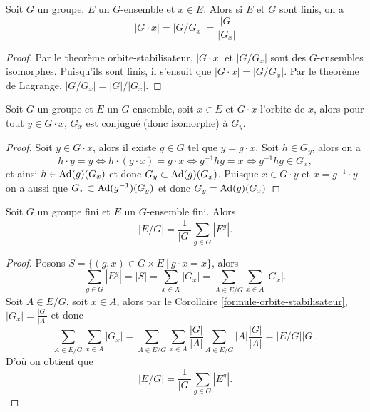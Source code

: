 \begin{cor}
	\label{formule-orbite-stabilisateur}
	Soit $G$ un groupe, $E$ un $G$-ensemble et $x \in E$. Alors si $E$ et $G$ sont finis, on a
	\begin{equation*}
		|G \cdot x| = |G/G_x| = \frac{|G|}{|G_x|}
	\end{equation*}
\end{cor}

\begin{proof}
	Par le theorème orbite-stabilisateur, $|G \cdot x|$ et $|G/G_x|$
	sont des $G$-ensembles isomorphes. Puisqu'ils sont finis,
	il s'ensuit que $|G \cdot x| = |G/G_x|$.
	Par le theorème de Lagrange, $|G/G_x| = |G|/|G_x|$.
\end{proof}

\begin{prop}
	\label{stab-conjugue}
	Soit $G$ un groupe et $E$ un $G$-ensemble, soit $x \in E$ et
	$G \cdot x$ l'orbite de $x$, alors pour tout $y \in G \cdot x$,
	$G_x$ est conjugué (donc isomorphe) à $G_y$.
\end{prop}

\begin{proof}
	Soit $y \in G \cdot x$, alors il existe $g \in G$ tel que $y = g \cdot x$.
	Soit $h \in G_y$, alors on a
	\begin{equation*}
		h \cdot y = y \iff h \cdot (g \cdot x) = g \cdot x \iff
		g^{-1} h g = x \iff g^{-1} h g \in G_x,
	\end{equation*}
	et ainsi $h \in \operatorname{Ad}(g)(G_x)$ et donc $G_y \subset \operatorname{Ad}(g)(G_x)$.
	Puisque $x \in G \cdot y$ et $x = g^{-1} \cdot y$ on a 
	aussi que $G_x \subset \operatorname{Ad}(g^{-1})(G_y)$ et donc $G_y = \operatorname{Ad}(g)(G_x)$
\end{proof}


\begin{thm}
	Soit $G$ un groupe fini et $E$ un $G$-ensemble fini. Alors
	\begin{equation*}
		|E/G| = \frac{1}{|G|}\sum_{g \in G}|E^g|.
	\end{equation*}
\end{thm}

\begin{proof}
	Posons $S = \{(g, x) \in G \times E\ |\ g \cdot x = x\}$, alors
	\begin{equation*}
		\sum_{g \in G} |E^g| = |S| = 
		\sum_{x \in X} |G_x| = \sum_{A \in E/G} \sum_{x \in A} |G_x|.
	\end{equation*}
	Soit $A \in E/G$, soit $x \in A$, alors par le Corollaire
	\ref{formule-orbite-stabilisateur}, $|G_x| = \frac{|G|}{|A|}$ et donc
	\begin{equation*}
		\sum_{A \in E/G} \sum_{x \in A} |G_x| = \sum_{A \in E/G} \sum_{x \in A}\frac{|G|}{|A|}
		\sum_{A \in E/G} |A|\frac{|G|}{|A|} = |E/G||G|.
	\end{equation*}
	D'où on obtient que
	\begin{equation*}
		|E/G| = \frac{1}{|G|}\sum_{g \in G}|E^g|.
	\end{equation*}
\end{proof}

